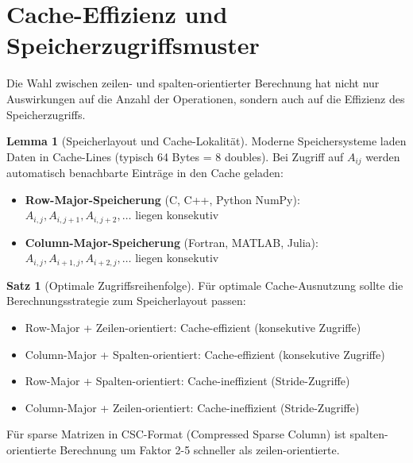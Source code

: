 ﻿\documentclass[a4paper,12pt]{report}
\theoremstyle{definition}
\newtheorem{satz}{Satz}
\newtheorem{lemma}{Lemma}
\begin{document}
	\section{Cache-Effizienz und Speicherzugriffsmuster}
	
	Die Wahl zwischen zeilen- und spalten-orientierter Berechnung hat nicht nur Auswirkungen auf die Anzahl der Operationen, sondern auch auf die Effizienz des Speicherzugriffs.
	
	\begin{lemma}[Speicherlayout und Cache-Lokalität]
		Moderne Speichersysteme laden Daten in Cache-Lines (typisch 64 Bytes = 8 doubles). Bei Zugriff auf $A_{ij}$ werden automatisch benachbarte Einträge in den Cache geladen:
		\begin{itemize}
			\item \textbf{Row-Major-Speicherung} (C, C++, Python NumPy): $A_{i,j}, A_{i,j+1}, A_{i,j+2}, \ldots$ liegen konsekutiv
			\item \textbf{Column-Major-Speicherung} (Fortran, MATLAB, Julia): $A_{i,j}, A_{i+1,j}, A_{i+2,j}, \ldots$ liegen konsekutiv
		\end{itemize}
	\end{lemma}
	
	\begin{satz}[Optimale Zugriffsreihenfolge]
		Für optimale Cache-Ausnutzung sollte die Berechnungsstrategie zum Speicherlayout passen:
		\begin{itemize}
			\item Row-Major + Zeilen-orientiert: Cache-effizient (konsekutive Zugriffe)
			\item Column-Major + Spalten-orientiert: Cache-effizient (konsekutive Zugriffe)
			\item Row-Major + Spalten-orientiert: Cache-ineffizient (Stride-Zugriffe)
			\item Column-Major + Zeilen-orientiert: Cache-ineffizient (Stride-Zugriffe)
		\end{itemize}
		
		Für sparse Matrizen in CSC-Format (Compressed Sparse Column) ist spalten-orientierte Berechnung um Faktor 2-5 schneller als zeilen-orientierte.
	\end{satz}
	
\end{document}
